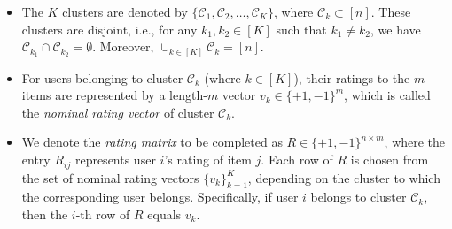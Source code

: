 \documentclass{article}
\begin{document}
\begin{itemize}[wide, labelwidth=!, labelindent=0pt]
    \item The $K$ clusters are denoted by $\{\mathcal{C}_1, \mathcal{C}_2, \ldots, \mathcal{C}_K\}$, where $\mathcal{C}_k \subset [n]$. These clusters are disjoint, i.e., for any $k_1,k_2 \in [K]$ such that $k_1 \ne k_2$, we have $\mathcal{C}_{k_1} \cap \mathcal{C}_{k_2}=\emptyset$. Moreover, $\cup_{k \in [K]} \mathcal{C}_k = [n]$.
    
    \item For users belonging to cluster $\mathcal{C}_k$ (where $k \in [K]$), their ratings to the $m$ items are represented by a length-$m$ vector $v_k \in \{+1,-1\}^m$, which is called the \emph{nominal rating vector} of cluster $\mathcal{C}_k$.
    
    \item We denote the \emph{rating matrix} to be completed as $R \in \{+1, -1\}^{n \times m}$, where the entry $R_{ij}$ represents user $i$'s rating of item $j$. Each row of $R$ is chosen from the set of nominal rating vectors $\{v_k\}_{k=1}^K$, depending on the cluster to which the corresponding user belongs. Specifically, if user $i$ belongs to cluster $\mathcal{C}_k$, then the $i$-th row of $R$ equals $v_k$.

\end{itemize} 
\end{document}
